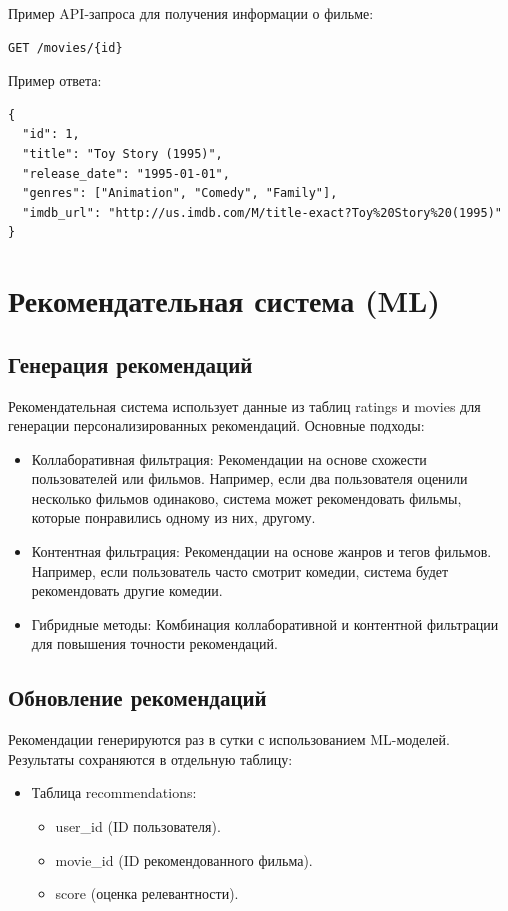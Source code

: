 Пример API-запроса для получения информации о фильме:
\begin{verbatim}
GET /movies/{id}
\end{verbatim}

Пример ответа:
\begin{verbatim}
{
  "id": 1,
  "title": "Toy Story (1995)",
  "release_date": "1995-01-01",
  "genres": ["Animation", "Comedy", "Family"],
  "imdb_url": "http://us.imdb.com/M/title-exact?Toy%20Story%20(1995)"
}
\end{verbatim}

\section{Рекомендательная система (ML)}

\subsection*{Генерация рекомендаций}
Рекомендательная система использует данные из таблиц ratings и movies для генерации персонализированных рекомендаций. Основные подходы:
\begin{itemize}
    \item Коллаборативная фильтрация: Рекомендации на основе схожести пользователей или фильмов. Например, если два пользователя оценили несколько фильмов одинаково, система может рекомендовать фильмы, которые понравились одному из них, другому.
    \item Контентная фильтрация: Рекомендации на основе жанров и тегов фильмов. Например, если пользователь часто смотрит комедии, система будет рекомендовать другие комедии.
    \item Гибридные методы: Комбинация коллаборативной и контентной фильтрации для повышения точности рекомендаций.
\end{itemize}

\subsection*{Обновление рекомендаций}
Рекомендации генерируются раз в сутки с использованием ML-моделей. Результаты сохраняются в отдельную таблицу:
\begin{itemize}
    \item Таблица recommendations:
    \begin{itemize}
        \item user\_id (ID пользователя).
        \item movie\_id (ID рекомендованного фильма).
        \item score (оценка релевантности).
    \end{itemize}
\end{itemize}

